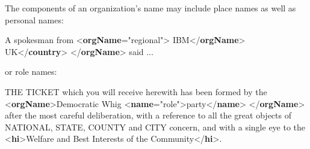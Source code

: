 The components of an organization's name may include place names as well as personal names: \par\bgroup{}\exampleFont \begin{shaded}\noindent\mbox{}A spokesman from {<\textbf{orgName}\hspace*{1em}{type}="{regional}">}\mbox{}\newline 
{}IBM{</\textbf{orgName}>}\mbox{}\newline 
{}UK{</\textbf{country}>}\mbox{}\newline 
{</\textbf{orgName}>} said ... \end{shaded}\egroup\par \noindent  or role names: \par\bgroup{}\exampleFont \begin{shaded}\noindent\mbox{}THE TICKET which you will\mbox{}\newline 
 receive herewith has been formed by the {<\textbf{orgName}>}Democratic Whig {<\textbf{name}\hspace*{1em}{type}="{role}">}party{</\textbf{name}>}\mbox{}\newline 
{</\textbf{orgName}>} after the most careful deliberation, with a reference to all the great objects of NATIONAL, STATE, COUNTY and\mbox{}\newline 
 CITY concern, and with a single eye to the {<\textbf{hi}>}Welfare and Best Interests of the Community{</\textbf{hi}>}.\end{shaded}\egroup\par \par
